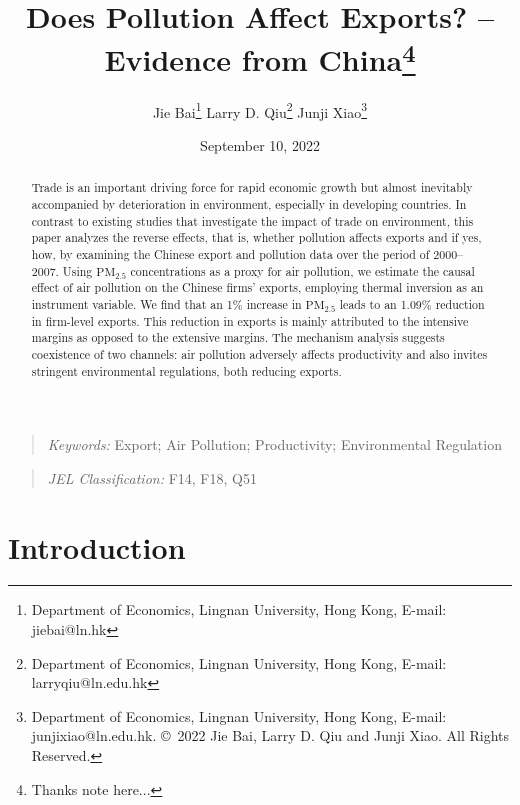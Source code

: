 \documentclass[12pt]{article}
\begin{document}
\title{Does Pollution Affect Exports? -- Evidence from China\thanks{%
Thanks note here...}}
\author{Jie Bai\thanks{%
Department of Economics, Lingnan University, Hong Kong, E-mail: jiebai@ln.hk}
\quad Larry D. Qiu\thanks{%
Department of Economics, Lingnan University, Hong Kong, E-mail:
larryqiu@ln.edu.hk} \quad Junji Xiao\thanks{%
Department of Economics, Lingnan University, Hong Kong, E-mail:
junjixiao@ln.edu.hk. \copyright\ 2022 Jie Bai, Larry D. Qiu and Junji Xiao.
All Rights Reserved. }}
\date{September 10, 2022}
\maketitle

\begin{abstract}
  Trade is an important driving force for rapid economic growth but almost
  inevitably accompanied by deterioration in environment, especially in
  developing countries. In contrast to existing studies that investigate the
  impact of trade on environment, this paper analyzes the reverse effects,
  that is, whether pollution affects exports and if yes, how, by examining the
  Chinese export and pollution data over the period of 2000--2007. Using $%
  \mathrm{PM_{2.5}}$ concentrations as a proxy for air pollution, we estimate
  the causal effect of air pollution on the Chinese firms' exports, employing
  thermal inversion as an instrument variable. We find that an 1\% increase in 
  $\mathrm{PM_{2.5}}$ leads to an 1.09\% reduction in firm-level exports. This
  reduction in exports is mainly attributed to the intensive margins as
  opposed to the extensive margins. The mechanism analysis suggests
  coexistence of two channels: air pollution adversely affects productivity
  and also invites stringent environmental regulations, both reducing exports.
  \end{abstract}
  \begin{quote}
    \emph{Keywords:} Export; Air Pollution; Productivity; Environmental
    Regulation
    \end{quote}
    \begin{quote}
    \emph{JEL Classification:} F14, F18, Q51
    \end{quote}
    \newpage
    \setcounter{page}{1}
    \section{Introduction}
\end{document}
